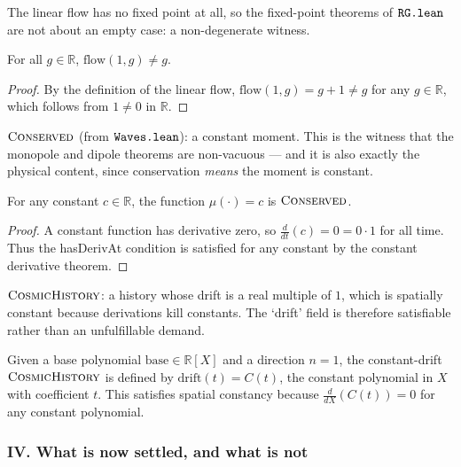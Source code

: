 \begin{theorem}
\label{thm:linearFlow_moves}
The linear flow has no fixed point at all, so the fixed-point theorems
of $\text{\texttt{RG.lean}}$ are not about an empty case: a non-degenerate witness.

For all $g \in \mathbb{R}$, $\text{flow}(1, g) \neq g$.

\begin{proof}
By the definition of the linear flow, $\text{flow}(1, g) = g + 1 \neq g$ for any $g \in \mathbb{R}$,
which follows from $1 \neq 0$ in $\mathbb{R}$.
\end{proof}
\end{theorem}

\begin{theorem}
\label{thm:constMoment_conserved}
$\text{\textsc{Conserved}}$ (from $\text{\texttt{Waves.lean}}$): a constant moment.  This is the witness
that the monopole and dipole theorems are non-vacuous — and it is also exactly
the physical content, since conservation \emph{means} the moment is constant.

For any constant $c \in \mathbb{R}$, the function $\mu(\cdot) = c$ is $\text{\textsc{Conserved}}$.

\begin{proof}
A constant function has derivative zero, so $\frac{d}{dt}(c) = 0 = 0 \cdot 1$ for all time.
Thus the hasDerivAt condition is satisfied for any constant by the constant derivative theorem.
\end{proof}
\end{theorem}

\begin{definition}
\label{def:constantDrift}
$\text{\textsc{CosmicHistory}}$: a history whose drift is a real multiple of $1$, which
is spatially constant because derivations kill constants.  The `drift' field is
therefore satisfiable rather than an unfulfillable demand. 

Given a base polynomial $\text{base} \in \mathbb{R}[X]$ and a direction $n = 1$, the constant-drift
$\text{\textsc{CosmicHistory}}$ is defined by $\text{drift}(t) = C(t)$, the constant polynomial
in $X$ with coefficient $t$. This satisfies spatial constancy because
$\frac{d}{dX}(C(t)) = 0$ for any constant polynomial.
\end{definition}

\subsubsection*{IV. What is now settled, and what is not}

